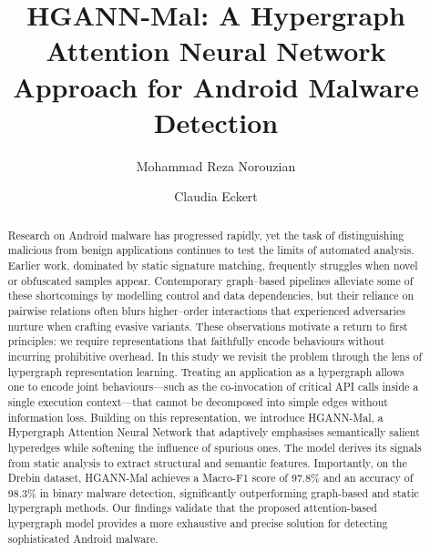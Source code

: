 \documentclass[runningheads]{llncs}
\begin{document}
%
\title{HGANN-Mal: A Hypergraph Attention Neural Network Approach for Android Malware Detection}

%
\author{}  
\institute{}

%
\author{Mohammad Reza Norouzian \and Claudia Eckert}
%
%

%
\maketitle              %
%
\begin{abstract}
Research on Android malware has progressed rapidly, yet the task of distinguishing malicious from benign applications continues to test the limits of automated analysis. Earlier work, dominated by static signature matching, frequently struggles when novel or obfuscated samples appear. Contemporary graph–based pipelines alleviate some of these shortcomings by modelling control and data dependencies, but their reliance on pairwise relations often blurs higher–order interactions that experienced adversaries nurture when crafting evasive variants. These observations motivate a return to first principles: we require representations that faithfully encode behaviours without incurring prohibitive overhead.
In this study we revisit the problem through the lens of hypergraph representation learning. Treating an application as a hypergraph allows one to encode joint behaviours—such as the co‑invocation of critical API calls inside a single execution context—that cannot be decomposed into simple edges without information loss. Building on this representation, we introduce HGANN‑Mal, a Hypergraph Attention Neural Network that adaptively emphasises semantically salient hyperedges while softening the influence of spurious ones. The model derives its signals from static analysis to extract structural and semantic features.
Importantly, on the Drebin dataset, HGANN-Mal achieves a Macro-F1 score of 97.8\% and an accuracy of 98.3\% in binary malware detection, significantly outperforming graph-based and static hypergraph methods. Our findings validate that the proposed attention-based hypergraph model provides a more exhaustive and precise solution for detecting sophisticated Android malware.
\end{abstract}
\end{document}
